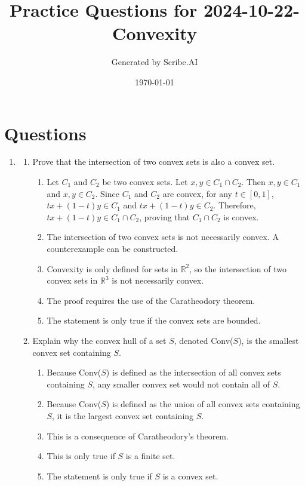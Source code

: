 \documentclass{article}%
\title{Practice Questions for 2024{-}10{-}22{-}Convexity}%
\author{Generated by Scribe.AI}%
\date{\today}%
\begin{document}
%
\normalsize%
\maketitle%
\section{Questions}%
\label{sec:Questions}%
\begin{enumerate}%
\item%
\begin{enumerate}%
\item Prove that the intersection of two convex sets is also a convex set.%
\begin{enumerate}%
\item Let $C_1$ and $C_2$ be two convex sets. Let $x, y \in C_1 \cap C_2$. Then $x, y \in C_1$ and $x, y \in C_2$. Since $C_1$ and $C_2$ are convex, for any $t \in [0, 1]$, $tx + (1-t)y \in C_1$ and $tx + (1-t)y \in C_2$. Therefore, $tx + (1-t)y \in C_1 \cap C_2$, proving that $C_1 \cap C_2$ is convex.%
\item The intersection of two convex sets is not necessarily convex. A counterexample can be constructed.%
\item Convexity is only defined for sets in $\mathbb{R}^2$, so the intersection of two convex sets in $\mathbb{R}^3$ is not necessarily convex.%
\item The proof requires the use of the Caratheodory theorem.%
\item The statement is only true if the convex sets are bounded.%
\end{enumerate}%
\vspace{0.5em}%
\item Explain why the convex hull of a set $S$, denoted Conv($S$), is the smallest convex set containing $S$.%
\begin{enumerate}%
\item Because Conv($S$) is defined as the intersection of all convex sets containing $S$, any smaller convex set would not contain all of $S$.%
\item Because Conv($S$) is defined as the union of all convex sets containing $S$, it is the largest convex set containing $S$.%
\item This is a consequence of Caratheodory's theorem.%
\item This is only true if $S$ is a finite set.%
\item The statement is only true if $S$ is a convex set.%
\end{enumerate}%

\end{enumerate}
\end{enumerate}
\end{document}

